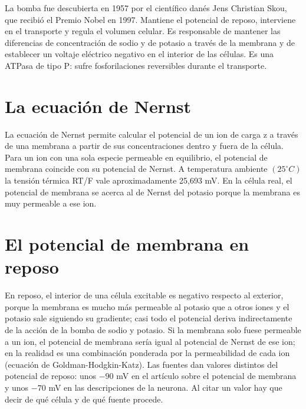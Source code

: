 \documentclass{book}
\begin{document}
La bomba fue descubierta en 1957 por el científico danés Jens Christian Skou, que recibió el Premio Nobel en 1997. Mantiene el potencial de reposo, interviene en el transporte y regula el volumen celular. Es responsable de mantener las diferencias de concentración de sodio y de potasio a través de la membrana y de establecer un voltaje eléctrico negativo en el interior de las células. Es una ATPasa de tipo P: sufre fosforilaciones reversibles durante el transporte.


\section{La ecuación de Nernst}

La ecuación de Nernst permite calcular el potencial de un ion de carga z a través de una membrana a partir de sus concentraciones dentro y fuera de la célula. Para un ion con una sola especie permeable en equilibrio, el potencial de membrana coincide con su potencial de Nernst. A temperatura ambiente \((25 ^{\circ}C)\) la tensión térmica RT/F vale aproximadamente 25,693 mV. En la célula real, el potencial de membrana se acerca al de Nernst del potasio porque la membrana es muy permeable a ese ion.


\section{El potencial de membrana en reposo}

En reposo, el interior de una célula excitable es negativo respecto al exterior, porque la membrana es mucho más permeable al potasio que a otros iones y el potasio sale siguiendo su gradiente; casi todo el potencial deriva indirectamente de la acción de la bomba de sodio y potasio. Si la membrana solo fuese permeable a un ion, el potencial de membrana sería igual al potencial de Nernst de ese ion; en la realidad es una combinación ponderada por la permeabilidad de cada ion (ecuación de Goldman-Hodgkin-Katz). Las fuentes dan valores distintos del potencial de reposo: unos \(-90\) mV en el artículo sobre el potencial de membrana y unos \(-70\) mV en las descripciones de la neurona. Al citar un valor hay que decir de qué célula y de qué fuente procede.
\end{document}
